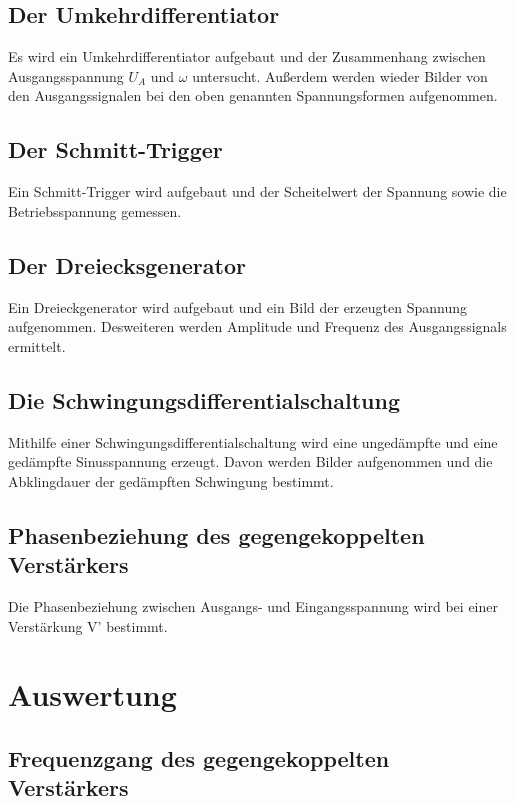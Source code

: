 \documentclass[]{scrartcl}
\begin{document}
\subsection{Der Umkehrdifferentiator}
Es wird ein Umkehrdifferentiator aufgebaut und der Zusammenhang zwischen Ausgangsspannung $U_A $ und $\omega$ untersucht. Außerdem werden wieder Bilder von den Ausgangssignalen bei den oben genannten Spannungsformen aufgenommen.

\subsection{Der Schmitt-Trigger}
Ein Schmitt-Trigger wird aufgebaut und der Scheitelwert der Spannung sowie die Betriebsspannung gemessen.

\subsection{Der Dreiecksgenerator}
Ein Dreieckgenerator wird aufgebaut und ein Bild der erzeugten Spannung aufgenommen. Desweiteren werden Amplitude und Frequenz des Ausgangssignals ermittelt.

\subsection{Die Schwingungsdifferentialschaltung}
Mithilfe einer Schwingungsdifferentialschaltung wird eine ungedämpfte und eine gedämpfte Sinusspannung erzeugt. Davon werden Bilder aufgenommen und die Abklingdauer der gedämpften Schwingung bestimmt.

\subsection{Phasenbeziehung des gegengekoppelten Verstärkers}
Die Phasenbeziehung zwischen Ausgangs- und Eingangsspannung wird bei einer Verstärkung V' bestimmt.

\section{Auswertung}

\subsection{Frequenzgang des gegengekoppelten Verstärkers}
\end{document}
